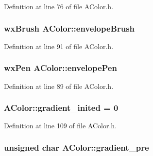 Definition at line 76 of file A\+Color.\+h.

\subsubsection[{\texorpdfstring{envelope\+Brush}{envelopeBrush}}]{\setlength{\rightskip}{0pt plus 5cm}wx\+Brush A\+Color\+::envelope\+Brush\hspace{0.3cm}{\ttfamily [static]}}\hypertarget{class_a_color_a725a9c00622fbc99047ea1290ec98320}{}\label{class_a_color_a725a9c00622fbc99047ea1290ec98320}


Definition at line 91 of file A\+Color.\+h.

\subsubsection[{\texorpdfstring{envelope\+Pen}{envelopePen}}]{\setlength{\rightskip}{0pt plus 5cm}wx\+Pen A\+Color\+::envelope\+Pen\hspace{0.3cm}{\ttfamily [static]}}\hypertarget{class_a_color_a9706bc519ec6f6b7f93ddc6371331f07}{}\label{class_a_color_a9706bc519ec6f6b7f93ddc6371331f07}


Definition at line 89 of file A\+Color.\+h.

\subsubsection[{\texorpdfstring{gradient\+\_\+inited}{gradient_inited}}]{ A\+Color\+::gradient\+\_\+inited = 0\hspace{0.3cm}{\ttfamily [static]}}\hypertarget{class_a_color_af4e9e5c98828505ce2617cc16659ee3e}{}\label{class_a_color_af4e9e5c98828505ce2617cc16659ee3e}


Definition at line 109 of file A\+Color.\+h.

\subsubsection[{\texorpdfstring{gradient\+\_\+pre}{gradient_pre}}]{\setlength{\rightskip}{0pt plus 5cm}unsigned char A\+Color\+::gradient\+\_\+pre\hspace{0.3cm}{\ttfamily [static]}}\hypertarget{class_a_color_a198d820095e3b59e4db026695ad092a2}{}\label{class_a_color_a198d820095e3b59e4db026695ad092a2}


